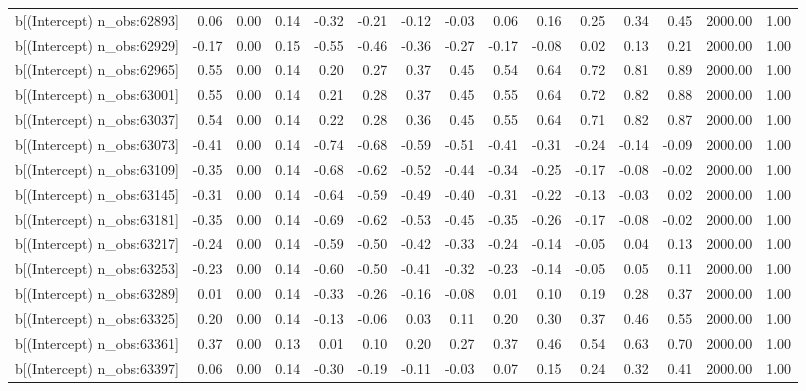 \begin{table}[ht]
\begin{tabular}{rrrrrrrrrrrrrrr}
  b[(Intercept) n\_obs:62893] & 0.06 & 0.00 & 0.14 & -0.32 & -0.21 & -0.12 & -0.03 & 0.06 & 0.16 & 0.25 & 0.34 & 0.45 & 2000.00 & 1.00 \\ 
  b[(Intercept) n\_obs:62929] & -0.17 & 0.00 & 0.15 & -0.55 & -0.46 & -0.36 & -0.27 & -0.17 & -0.08 & 0.02 & 0.13 & 0.21 & 2000.00 & 1.00 \\ 
  b[(Intercept) n\_obs:62965] & 0.55 & 0.00 & 0.14 & 0.20 & 0.27 & 0.37 & 0.45 & 0.54 & 0.64 & 0.72 & 0.81 & 0.89 & 2000.00 & 1.00 \\ 
  b[(Intercept) n\_obs:63001] & 0.55 & 0.00 & 0.14 & 0.21 & 0.28 & 0.37 & 0.45 & 0.55 & 0.64 & 0.72 & 0.82 & 0.88 & 2000.00 & 1.00 \\ 
  b[(Intercept) n\_obs:63037] & 0.54 & 0.00 & 0.14 & 0.22 & 0.28 & 0.36 & 0.45 & 0.55 & 0.64 & 0.71 & 0.82 & 0.87 & 2000.00 & 1.00 \\ 
  b[(Intercept) n\_obs:63073] & -0.41 & 0.00 & 0.14 & -0.74 & -0.68 & -0.59 & -0.51 & -0.41 & -0.31 & -0.24 & -0.14 & -0.09 & 2000.00 & 1.00 \\ 
  b[(Intercept) n\_obs:63109] & -0.35 & 0.00 & 0.14 & -0.68 & -0.62 & -0.52 & -0.44 & -0.34 & -0.25 & -0.17 & -0.08 & -0.02 & 2000.00 & 1.00 \\ 
  b[(Intercept) n\_obs:63145] & -0.31 & 0.00 & 0.14 & -0.64 & -0.59 & -0.49 & -0.40 & -0.31 & -0.22 & -0.13 & -0.03 & 0.02 & 2000.00 & 1.00 \\ 
  b[(Intercept) n\_obs:63181] & -0.35 & 0.00 & 0.14 & -0.69 & -0.62 & -0.53 & -0.45 & -0.35 & -0.26 & -0.17 & -0.08 & -0.02 & 2000.00 & 1.00 \\ 
  b[(Intercept) n\_obs:63217] & -0.24 & 0.00 & 0.14 & -0.59 & -0.50 & -0.42 & -0.33 & -0.24 & -0.14 & -0.05 & 0.04 & 0.13 & 2000.00 & 1.00 \\ 
  b[(Intercept) n\_obs:63253] & -0.23 & 0.00 & 0.14 & -0.60 & -0.50 & -0.41 & -0.32 & -0.23 & -0.14 & -0.05 & 0.05 & 0.11 & 2000.00 & 1.00 \\ 
  b[(Intercept) n\_obs:63289] & 0.01 & 0.00 & 0.14 & -0.33 & -0.26 & -0.16 & -0.08 & 0.01 & 0.10 & 0.19 & 0.28 & 0.37 & 2000.00 & 1.00 \\ 
  b[(Intercept) n\_obs:63325] & 0.20 & 0.00 & 0.14 & -0.13 & -0.06 & 0.03 & 0.11 & 0.20 & 0.30 & 0.37 & 0.46 & 0.55 & 2000.00 & 1.00 \\ 
  b[(Intercept) n\_obs:63361] & 0.37 & 0.00 & 0.13 & 0.01 & 0.10 & 0.20 & 0.27 & 0.37 & 0.46 & 0.54 & 0.63 & 0.70 & 2000.00 & 1.00 \\ 
  b[(Intercept) n\_obs:63397] & 0.06 & 0.00 & 0.14 & -0.30 & -0.19 & -0.11 & -0.03 & 0.07 & 0.15 & 0.24 & 0.32 & 0.41 & 2000.00 & 1.00 \\ 

\end{tabular}
\end{table}
